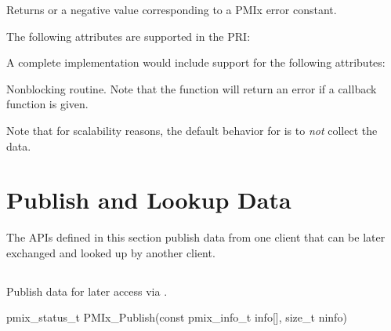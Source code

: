 \begin{arglist}
\end{arglist}

Returns  or a negative value corresponding to a PMIx error constant.

\priattr
The following attributes are supported in the \ac{PRI}:


\optattr
A complete implementation would include support for the following attributes:


\descr

Nonblocking  routine.
Note that the function will return an error if a  callback function is given.

Note that for scalability reasons, the default behavior for  is to \emph{not} collect the data.


\section{Publish and Lookup Data}
\label{chap:api_kv_mgmt:publish}

The APIs defined in this section publish data from one client that can be later exchanged and looked up by another client.

\subsection{}

\summary

Publish data for later access via .

\format

\cspecificstart
\begin{codepar}
pmix_status_t
PMIx_Publish(const pmix_info_t info[], size_t ninfo)
\end{codepar}
\cspecificend

